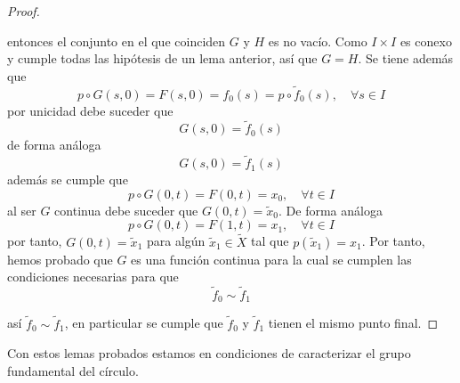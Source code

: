 \documentclass{article}
\theoremstyle{largebreak}
\begin{document}
\begin{proof}
\begin{itemize}
            entonces el conjunto en el que coinciden $G$ y $H$ es no vacío. Como $I\times I$ es conexo y cumple todas las hipótesis de un lema anterior, así que $G=H$. Se tiene además que
            \begin{equation*}
                p\circ G(s,0)= F(s,0)=f_0(s)=p\circ \widetilde{f}_0(s),\quad\forall s\in I
            \end{equation*}
            por unicidad debe suceder que
            \begin{equation*}
                G(s,0)=\widetilde{f}_0(s)
            \end{equation*}
            de forma análoga
            \begin{equation*}
                G(s,0)=\widetilde{f}_1(s)
            \end{equation*}
            además se cumple que
            \begin{equation*}
                p\circ G(0,t)=F(0,t)=x_0,\quad\forall t\in I
            \end{equation*}
            al ser $G$ continua debe suceder que $G(0,t)=\widetilde{x}_0$. De forma análoga
            \begin{equation*}
                p\circ G(0,t)=F(1,t)=x_1,\quad\forall t\in I
            \end{equation*}
            por tanto, $G(0,t)=\widetilde{x}_1$ para algún $\widetilde{x}_1\in\widetilde{X}$ tal que $p(\widetilde{x}_1)=x_1$. Por tanto, hemos probado que $G$ es una función continua para la cual se cumplen las condiciones necesarias para que
            \begin{equation*}
                \widetilde{f}_0\sim\widetilde{f}_1
            \end{equation*}
        \end{itemize}
        así $\widetilde{f}_0\sim\widetilde{f}_1$, en particular se cumple que $\widetilde{f}_0$ y $\widetilde{f}_1$ tienen el mismo punto final.
    \end{proof}

    Con estos lemas probados estamos en condiciones de caracterizar el grupo fundamental del círculo.
\end{document}

